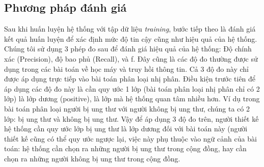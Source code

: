 \subsection{Phương pháp đánh giá}
Sau khi huấn luyện hệ thống với tập dữ liệu \textit{training}, bước tiếp theo là đánh giá kết quả huấn luyện để xác định mức độ tin cậy cũng như hiệu quả của hệ thống. Chúng tôi sử dụng 3 phép đo sau để đánh giá hiệu quả của hệ thống: Độ chính xác (Precision), độ bao phủ (Recall), và f. Đây cũng là các độ đo thường được sử dụng trong các bài toán về học máy và truy hồi thông tin. Cả 3 độ đo này chỉ được áp dụng trực tiếp vào bài toán phân loại nhị phân. Điều kiện trước tiên để áp dụng các độ đo này là cần quy ước 1 lớp (bài toán phân loại nhị phân chỉ có 2 lớp) là lớp dương (positive), là lớp mà hệ thống quan tâm nhiều hơn. Ví dụ trong bài toán phân loại người bị ung thư với người không bị ung thư, chúng ta có 2 lớp: bị ung thư và không bị ung thư. Vậy để áp dụng 3 độ đo trên, người thiết kế hệ thống cần quy ước lớp bị ung thư là lớp dương đối với bài toán này (người thiết kế cũng có thể quy ước ngược lại, việc này phụ thuộc vào ngữ cảnh của bài toán: hệ thống cần chọn ra những người bị ung thư trong cộng đồng, hay cần chọn ra những người không bị ung thư trong cộng đồng.
